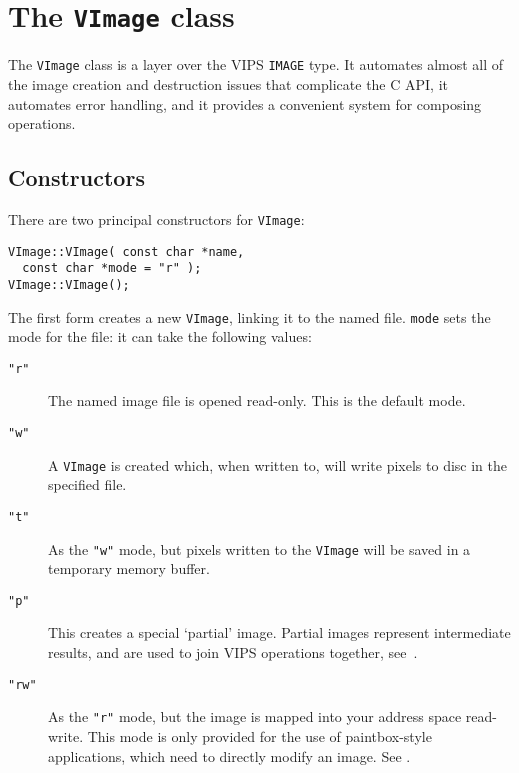 \section{The \texttt{VImage} class}

The \verb+VImage+ class is a layer over the VIPS \verb+IMAGE+ type. It
automates almost all of the image creation and destruction issues that
complicate the C API, it automates error handling, and it provides a
convenient system for composing operations.

\subsection{Constructors}

There are two principal constructors for \verb+VImage+:

\begin{verbatim}
VImage::VImage( const char *name, 
  const char *mode = "r" );
VImage::VImage();
\end{verbatim}

The first form creates a new \verb+VImage+, linking it to the named file.
\verb+mode+ sets the mode for the file: it can take the following values:

\begin{description}

\item[\texttt{"r"}]
The named image file is opened read-only. This is the default mode.

\item[\texttt{"w"}]
A \verb+VImage+ is created which, when written to, will write pixels to disc
in the specified file.

\item[\texttt{"t"}]
As the \verb'"w"' mode, but pixels written to the \verb+VImage+ will be saved
in a temporary memory buffer.

\item[\texttt{"p"}]
This creates a special `partial' image. Partial images represent
intermediate results, and are used to join VIPS operations together,
see~.

\item[\texttt{"rw"}]
As the \verb'"r"' mode, but the image is mapped into your address space
read-write. This mode is only provided for the use of paintbox-style
applications, which need to directly modify an image. See .

\end{description}

